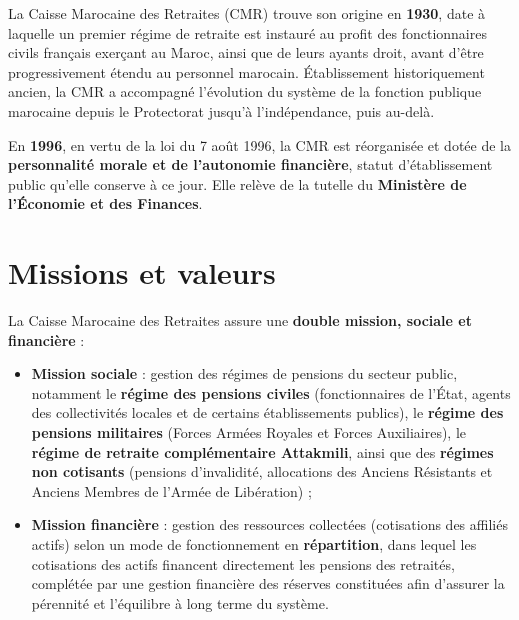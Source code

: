 \documentclass{rapportENSIAS} %
\begin{document}
\noindent
La Caisse Marocaine des Retraites (CMR) trouve son origine en \textbf{1930}, date à laquelle un premier régime de retraite est instauré au profit des fonctionnaires civils français exerçant au Maroc, ainsi que de leurs ayants droit, avant d'être progressivement étendu au personnel marocain. Établissement historiquement ancien, la CMR a accompagné l'évolution du système de la fonction publique marocaine depuis le Protectorat jusqu'à l'indépendance, puis au-delà.

\vspace{0.3cm}
\noindent
En \textbf{1996}, en vertu de la loi du 7 août 1996, la CMR est réorganisée et dotée de la \textbf{personnalité morale et de l'autonomie financière}, statut d'établissement public qu'elle conserve à ce jour. Elle relève de la tutelle du \textbf{Ministère de l'Économie et des Finances}.

\vspace{0.3cm}
\noindent

\section{Missions et valeurs}

\noindent
La Caisse Marocaine des Retraites assure une \textbf{double mission, sociale et financière} :

\begin{itemize}
    \item \textbf{Mission sociale} : gestion des régimes de pensions du secteur public, notamment le \textbf{régime des pensions civiles} (fonctionnaires de l'État, agents des collectivités locales et de certains établissements publics), le \textbf{régime des pensions militaires} (Forces Armées Royales et Forces Auxiliaires), le \textbf{régime de retraite complémentaire Attakmili}, ainsi que des \textbf{régimes non cotisants} (pensions d'invalidité, allocations des Anciens Résistants et Anciens Membres de l'Armée de Libération) ;
    \item \textbf{Mission financière} : gestion des ressources collectées (cotisations des affiliés actifs) selon un mode de fonctionnement en \textbf{répartition}, dans lequel les cotisations des actifs financent directement les pensions des retraités, complétée par une gestion financière des réserves constituées afin d'assurer la pérennité et l'équilibre à long terme du système.
\end{itemize}
\end{document}
